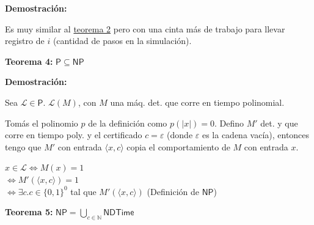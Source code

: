 \documentclass{article}
\begin{document}
\begin{flushleft}
  \textbf{\textcolor{Mulberry}{Demostración:}}

  Es muy similar al \hyperlink{teo2}{\textcolor{Rhodamine}{teorema 2}} pero con una cinta más de trabajo
  para llevar registro de $i$ (cantidad de pasos en la simulación).
\end{flushleft}

\pagebreak

\begin{flushleft}
  \textbf{Teorema 4:}
  $\mathsf{P} \subseteq \mathsf{NP}$
\end{flushleft}

\begin{flushleft}
  \textbf{\textcolor{Mulberry}{Demostración:}}

  Sea $\mathcal{L} \in \mathsf{P}$. $\mathcal{L}(M)$, con $M$ una máq. det. que corre en tiempo 
  polinomial.

  Tomás el polinomio $p$ de la definición como $p(|x|) = 0$. Defino $M'$ det. y que corre en tiempo poly.
  y el certificado $c = \varepsilon$ (donde $\varepsilon$ es la cadena vacía), entonces tengo que $M'$ con 
  entrada $\langle x,c \rangle$ copia el comportamiento de $M$ con entrada $x$.
\end{flushleft}

\begin{center}
  $x \in \mathcal{L} \iff M(x) = 1$  \\
  $\iff M'(\langle x,c \rangle) = 1$  \\
  $\iff \exists c. c\in \{0,1\}^0$ tal que $M'(\langle x,c \rangle)$ (Definición de $\mathsf{NP}$)
\end{center}

\begin{flushleft}
  \textbf{Teorema 5:}
  $\mathsf{NP} = \bigcup_{c \in \mathbb{N}} \mathsf{NDTime}$
\end{flushleft}
\end{document}

